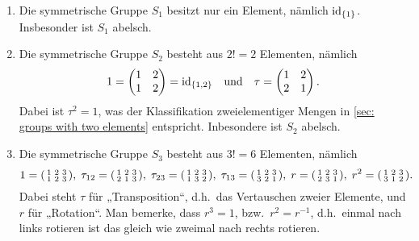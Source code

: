 \begin{bsp}
 \begin{enumerate}[leftmargin=*]
  \item
   Die symmetrische Gruppe $S_1$ besitzt nur ein Element, nämlich $\mathrm{id}_{\{1\}}$. Insbesonder ist $S_1$ abelsch.
  \item
   Die symmetrische Gruppe $S_2$ besteht aus $2! = 2$ Elementen, nämlich
   \[
    1 =
    \begin{pmatrix}
     1 & 2 \\
     1 & 2
    \end{pmatrix}
    = \mathrm{id}_{\{1,2\}}
    \quad\text{und}\quad
    \tau
    =
    \begin{pmatrix}
     1 & 2 \\
     2 & 1
    \end{pmatrix}.
   \]
   Dabei ist $\tau^2 = 1$, was der Klassifikation zweielementiger Mengen in \ref{sec: groups with two elements} entspricht. Inbesondere ist $S_2$ abelsch.
  \item
   Die symmetrische Gruppe $S_3$ besteht aus $3! = 6$ Elementen, nämlich
   \[
    1 =
    \begin{psmallmatrix}
     1 & 2 & 3 \\
     1 & 2 & 3
    \end{psmallmatrix},
    \;
    \tau_{12}
    =
    \begin{psmallmatrix}
     1 & 2 & 3 \\
     2 & 1 & 3
    \end{psmallmatrix},
    \;
    \tau_{23}
    =
    \begin{psmallmatrix}
     1 & 2 & 3 \\
     1 & 3 & 2
    \end{psmallmatrix},
    \;
    \tau_{13}
    =
    \begin{psmallmatrix}
     1 & 2 & 3 \\
     3 & 2 & 1
    \end{psmallmatrix},
    \;
    r
    =
    \begin{psmallmatrix}
     1 & 2 & 3 \\
     2 & 3 & 1
    \end{psmallmatrix},
    \;
    r^2
    =
    \begin{psmallmatrix}
     1 & 2 & 3 \\
     3 & 1 & 2
    \end{psmallmatrix}.
   \]
   Dabei steht $\tau$ für „Transposition“, d.h.\ das Vertauschen zweier Elemente, und $r$ für „Rotation“. Man bemerke, dass $r^3 = 1$, bzw.\ $r^2 = r^{-1}$, d.h.\ einmal nach links rotieren ist das gleich wie zweimal nach rechts rotieren.
   

\end{enumerate}
\end{bsp}
